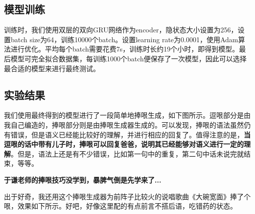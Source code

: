 \documentclass[12pt]{article} %
\begin{document}
\begin{sloppypar}
\subsection{模型训练}

训练时，我们使用双层的双向GRU网络作为encoder，隐状态大小设置为256，设置batch size为64，训练10000个batch。设置learning rate为0.0001，使用Adam算法进行优化。平均每个batch需要花费7s，训练时长约19个小时，即得到模型。最后模型可完全拟合数据集，每训练1000个batch便保存了一次模型，因此可以选择最合适的模型来进行最终测试。

\subsection{实验结果}

我们使用最终得到的模型进行了一段简单地捧哏生成，如下图所示。逗哏部分是由我自己编造的，捧哏部分则是由捧哏生成器生成的。可以发现，捧哏的语法虽然仍有错误，但是语义已经能比较好的理解，并进行相应的回复了。值得注意的是，{\bf 当逗哏的话中带有儿子时，捧哏可以回复爸爸，说明其已经能够对语义进行一定的理解}。但是，语法上还是有不少错误，比如第一句中的重复，第二句中话未说完就结束，等等。


\vspace{0.5cm}

{\bf 于谦老师的捧哏技巧没学到，暴脾气倒是先学来了...}

出于好奇，我还用这个捧哏生成器为前阵子比较火的说唱歌曲《大碗宽面》捧了个哏，效果如下所示。好吧，好像这里配的有点前言不搭后语，吃错药的状态。

\vspace{0.5cm}




\end{sloppypar}
\end{document}
